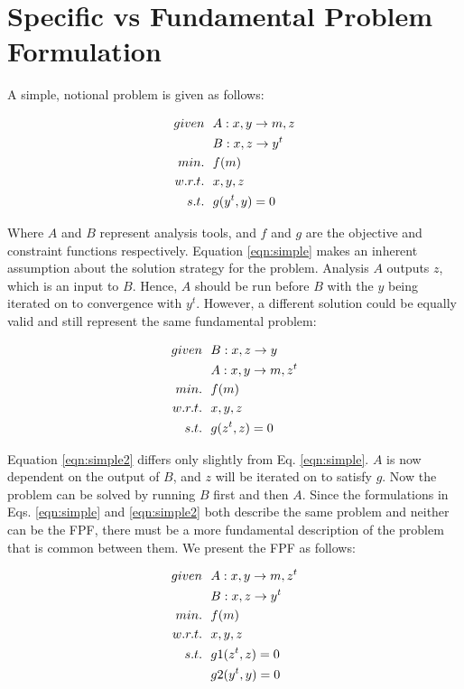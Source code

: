 \section{Specific vs Fundamental Problem Formulation }
    A simple, notional problem is given as follows: 

    \begin{align}
        given & \ \ A: {x,y} \rightarrow {m,z} \notag
        \\      & \ \ B: {x,z} \rightarrow {y^t} \notag
        \\min. &\ \ f(m) \notag
        \\w.r.t. & \ \ x,y,z \notag
        \\s.t. & \ \ g(y^t,y) = 0
        \label{eqn:simple}
    \end{align}

    Where $A$ and $B$ represent analysis tools, and $f$ and $g$ are the objective and constraint functions respectively. 
    Equation \ref{eqn:simple} makes an inherent assumption about the solution strategy for the problem. 
    Analysis $A$ outputs $z$, which is an input to $B$. Hence, $A$ should be run before $B$ with 
    the $y$ being iterated on to convergence with $y^t$. However, a different solution could be equally valid and still represent
    the same fundamental problem: 

    \begin{align}
        given & \ \ B: {x,z} \rightarrow {y} \notag
        \\      & \ \ A: {x,y} \rightarrow {m,z^t} \notag
        \\min. &\ \ f(m) \notag
        \\w.r.t. & \ \ x,y,z \notag
        \\s.t. & \ \ g(z^t,z) = 0
        \label{eqn:simple2}
    \end{align}

    Equation \ref{eqn:simple2} differs only slightly from Eq. \ref{eqn:simple}. $A$ is now dependent on the output of $B$, 
    and $z$ will be iterated on to satisfy $g$. Now the problem can be solved by running $B$ first and then $A$.
    Since the formulations in Eqs. \ref{eqn:simple} and \ref{eqn:simple2} both describe the same problem and neither can be the
    FPF, there must be a more fundamental description of the problem that is common between them. We present the FPF as follows: 

    \begin{align}
        given & \ \ A: {x,y} \rightarrow {m,z^t} \notag
        \\      & \ \ B: {x,z} \rightarrow {y^t} \notag
        \\min. &\ \ f(m) \notag
        \\w.r.t. & \ \ x,y,z \notag
        \\s.t. & \ \ g1(z^t,z) = 0 \notag
        \\     & \ \ g2(y^t,y) = 0
        \label{eqn:simple_fpf}
    \end{align}

